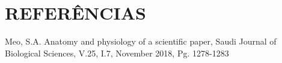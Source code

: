 \documentclass[
12pt,		%
openright,	%
twoside,  %
a4paper,			%
chapter=TITLE,		%
english,			%
french,				%
spanish,			%
brazil				%
]{USPSC-classe/USPSC}
\begin{document}
\chapter[REFER\^ENCIAS]{REFER\^ENCIAS}\label{REFER\^ENCIAS}
\begin{flushleft}
\begin{flushleft}
\begin{flushleft}
\begin{flushleft}
\begin{flushleft}
\begin{flushleft}
\begin{flushleft}
\begin{flushleft}
\begin{flushleft}
\begin{flushleft}
\begin{flushleft}
\begin{flushleft}
\begin{flushleft}
\begin{flushleft}
[MEO, 2018] Meo, S.A. Anatomy and physiology of a scientific paper, Saudi Journal of Biological Sciences, V.25, I.7, November 2018, Pg. 1278-1283
\end{flushleft}


\end{flushleft}


\end{flushleft}


\end{flushleft}


\end{flushleft}


\end{flushleft}


\end{flushleft}


\end{flushleft}


\end{flushleft}


\end{flushleft}


\end{flushleft}


\end{flushleft}


\end{flushleft}


\end{flushleft}
\end{document}
